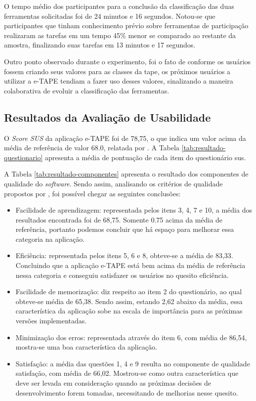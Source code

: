 \par
O tempo médio dos participantes para a conclusão da classificação das duas ferramentas solicitadas foi de 24 minutos e 16 segundos. 
Notou-se que participantes que tinham conhecimento prévio sobre ferramentas de participação realizaram 
as tarefas em um tempo 45\% menor se comparado ao restante da amostra, finalizando suas tarefas em 13 minutos e 17 segundos.

\par 
Outro ponto observado durante o experimento, foi o fato de conforme os usuários fossem criando seus valores para as classes da \acrshort{tape},
os próximos usuários a utilizar a e-TAPE tendiam a fazer uso desses valores, sinalizando a maneira colaborativa de evoluir a classificação das ferramentas.

\subsection{Resultados da Avaliação de Usabilidade}
\label{subsec:resultados-sus}
O \textit{Score SUS} da aplicação e-TAPE foi de 78,75, o que indica um valor acima da média de referência de valor 68.0, relatada por .
A Tabela \ref{tab:resultado-questionario} apresenta a média de pontuação de cada item do questionário \acrshort{sus}.

\par
A Tabela \ref{tab:resultado-componentes} apresenta o resultado dos componentes de qualidade do \textit{software}. Sendo assim, analisando os critérios de qualidade propostos
por , foi possível chegar as seguintes conclusões:

\begin{itemize}
    \item Facilidade de aprendizagem: representada pelos itens 3, 4, 7 e 10, a média dos resultados encontrada foi de 68,75. Somente 0.75 acima da média de referência, 
          portanto podemos concluir que há espaço para melhorar essa categoria na aplicação.
    \item Eficiência: representada pelos itens 5, 6 e 8, obteve-se a média de 83,33. Concluindo que a aplicação e-TAPE está bem acima da média de referência
          nessa categoria e conseguiu satisfazer os usuários no quesito eficiência.
    \item Facilidade de memorização: diz respeito ao item 2 do questionário, ao qual obteve-se média de 65,38. Sendo assim, estando 2,62 abaixo da média, 
          essa característica da aplicação sobe na escala de importância para as próximas versões implementadas.
    \item Minimização dos erros: representada através do item 6, com média de 86,54, mostra-se uma boa característica da aplicação.
    \item Satisfação: a média das questões 1, 4 e 9 resulta no componente de qualidade satisfação, com média de 66,02. 
          Mostrou-se como outra característica que deve ser levada em consideração quando as próximas decisões de desenvolvimento forem tomadas, necessitando de melhorias nesse quesito.
\end{itemize}

